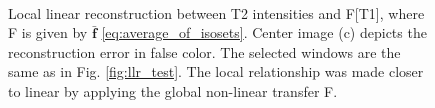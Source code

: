 \begin{figure}[t]
\centering
    \\
    \caption{{\small Local linear reconstruction between T2 intensities and F[T1], where F is given by $\mathbf{\bar{f}}$ \eqref{eq:average_of_isosets}. Center image (c) depicts the reconstruction error in false color. The selected windows are the same as in Fig. \ref{fig:llr_test}. The local relationship was made closer to linear by applying the global non-linear transfer F.}}
\label{fig:ecc_test_good}\figcloser
\end{figure}


